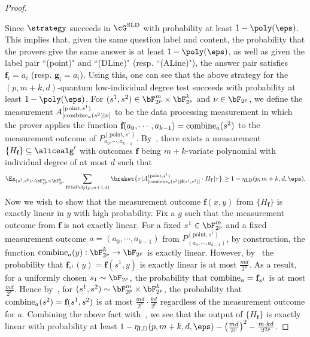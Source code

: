 \begin{proof}
\begin{enumerate}
\begin{itemize}
		\end{itemize}
	\end{enumerate}
	Since $\strategy$ succeeds in $\cG^{\text{SLD}}$ with probability at least $1 - \poly(\eps)$. This implies that, given the same question label and content, the probability that the provers give the same answer is at least $1 - \poly(\eps)$, as well as given the label pair ``(point)" and ``(DLine)" (resp. ``(ALine)"), the answer pair satisfies $\textbf{f}_i = a_i$ (resp.  $\textbf{g}_i = a_i$). Using this, one can see that the above strategy for the $(p,m+k,d)$-quantum low-individual degree test succeeds with probability at least  $1 - \poly(\eps)$. For $(s^1,s^2) \in \bF_{2^p}^m \times \bF_{2^p}^k$ and $\nu \in \bF_{2^p}$, we define the measurement $A^{(\text{point}, s^1)}_{[\text{combine}_{a}(s^2)|\nu]}$ to be the data processing measurement in which the prover applies the function $\textbf{f}(a_0, \cdots, a_{k-1}) = \text{combine}_{a}(s^2)$ to the measurement outcome of $P^{(\text{point}, s^1)}_{a_0, \cdots, a_{k-1}}$. By~, there exists a measurement $\{H_{\textbf{f}}\} \subseteq \alicealg'$ with outcomes $\textbf{f}$ being $m+k$-variate polynomial with individual degree of at most $d$ such that
	\begin{equation} \label{eq:sldt-1}
		\Ex_{(s^1, s^2) \sim \bF_{2^p}^m \times \bF_{2^p}^k} \sum_{\textbf{f} \in \text{IdPoly}(p,m+1,d)} \braket{\tau| A^{(\text{point}, s^1)}_{[\combinefun_{a}(s^2)| \textbf{f}(s^1, s^2)]} \cdot  H_{\textbf{f}} \,  |\tau} \geq 1 - \mathbf{\eta}_{\text{LD}}(p,m+k,d,\eps),
	\end{equation}
	Now we wish to show that the measurement outcome $\textbf{f}(x,y)$ from $\{H_{\textbf{f}}\}$ is exactly linear in $y$ with high probability. Fix a $\textit{g}$ such that the measurement outcome from $\textbf{f}$ is not exactly linear. For a fixed $s^{1} \in \bF_{2^p}^m$ and a fixed measurement outcome $a = (a_0, \cdots, a_{k-1})$ from $P^{(\text{point}, s^1)}_{(a_0, \cdots, a_{k-1})}$, by construction, the function $\combinefun_{a}(y):\bF_{2^p}^k \rightarrow \bF_{2^p}$ is exactly linear. However, by~ the probability that $\textbf{f}_{s^{1}}(y) = \textbf{f}(s^{1},y)$ is exactly linear is at most $\frac{md}{2^p}$. As a result, for a uniformly chosen $s_1 \sim \bF_{2^p}$, the probability that $\text{combine}_{a} = \textbf{f}_{s^{1}}$ is at most $\frac{md}{2^p}$. Hence by~, for $(s^1, s^2) \sim \bF_{2^p}^m \times \bF_{2^p}^k$, the probability that $\text{combine}_{a}(s^2) = \textbf{f}(s^1, s^2)$ is at most $\frac{md}{2^p}\cdot \frac{kd}{2^p}$ regardless of the measurement outcome for $a$. Combining the above fact with~, we see that the output of $\{H_{\textbf{f}}\}$ is exactly linear with probability at least $1 - \mathbf{\eta}_{\text{LD}}(p,m+k,d,\eps) - \left(\frac{md}{2^p}\right)^2 - \frac{m \cdot k d}{2^{2p}}$. 
	

\end{proof}
